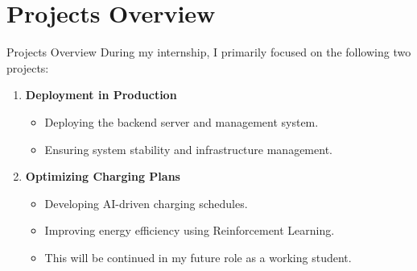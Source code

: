 \documentclass[11pt]{beamer}
\begin{document}
\section{Projects Overview}
\begin{frame}{Projects Overview}
    During my internship, I primarily focused on the following two projects:
    
    \vspace{0.5cm}
    
    \begin{enumerate}
        \item \textbf{Deployment in Production}
        \begin{itemize}
            \item Deploying the backend server and management system.
            \item Ensuring system stability and infrastructure management.
        \end{itemize}
        
        \vspace{0.3cm}
        
        \item \textbf{Optimizing Charging Plans}
        \begin{itemize}
            \item Developing AI-driven charging schedules.
            \item Improving energy efficiency using Reinforcement Learning.
            \item This will be continued in my future role as a working student.        
        \end{itemize}
    \end{enumerate}
\end{frame}
\end{document}
